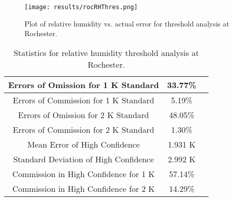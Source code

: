 \documentclass{book}
\begin{document}
\begin{minipage}[c]{0.47\textwidth}
\centering
\begin{figure}[H]
\texttt{[image: results/rocRHThres.png]}
\caption{Plot of relative humidity vs. actual error for threshold analysis at Rochester.}
\label{fig:rocRHThres}
\end{figure}
\end{minipage}
\begin{minipage}[c]{0.47\textwidth}
\begin{table}[H]
\centering
\footnotesize
\begin{tabular}{ | c | c | c | } \hline
Errors of Omission for 1 K Standard & 33.77\% \\ \hline
Errors of Commission for 1 K Standard & 5.19\% \\ \hline
Errors of Omission for 2 K Standard & 48.05\% \\ \hline
Errors of Commission for 2 K Standard & 1.30\% \\ \hline
Mean Error of High Confidence & 1.931 K \\ \hline
Standard Deviation of High Confidence & 2.992 K \\ \hline
Commission in High Confidence for 1 K & 57.14\% \\ \hline
Commission in High Confidence for 2 K & 14.29\% \\ \hline
\end{tabular}
\caption{Statistics for relative humidity threshold analysis at Rochester.}
\label{tab:rocRHThres}
\end{table}
\end{minipage}
\end{document}
